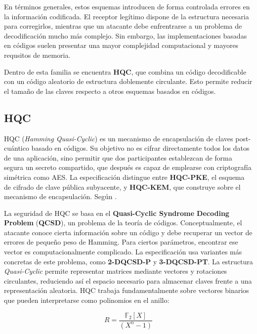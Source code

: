             En términos generales, estos esquemas introducen de forma controlada errores en la información codificada. El receptor legítimo dispone de la estructura necesaria para corregirlos, 
            mientras que un atacante debe enfrentrarse a un problema de decodificación mucho más complejo. Sin embargo, las implementaciones basadas en códigos suelen presentar una mayor complejidad
            computacional y mayores requsitos de memoria. 

            Dentro de esta familia se encuentra \textbf{HQC}, que combina un código decodificable con un código aleatorio de estructura doblemente circulante. Esto permite reducir el tamaño 
            de las claves respecto a otros esquemas basados en códigos. 


    \subsection{HQC}
    
    HQC (\textit{Hamming Quasi-Cyclic}) es un mecanismo de encapsulación de claves post-cuántico basado en códigos. Su objetivo no es cifrar directamente todos los datos de una aplicación, sino 
    permitir que dos participantes establezcan de forma segura un secreto compartido, que después es capaz de emplearse con criptografía simétrica como AES. La especificación distingue entre \textbf{HQC-PKE}, el esquema
    de cifrado de clave pública subyacente, y \textbf{HQC-KEM}, que construye sobre el mecanismo de encapsulación. Según \cite{noauthor_hamming_nodate}.

    La seguridad de HQC se basa en el \textbf{Quasi-Cyclic Syndrome Decoding Problem} (\textbf{QCSD}), un problema de la teoría de códigos. Conceptualmente, el atacante conoce cierta información 
    sobre un código y debe recuperar un vector de errores de pequeño peso de Hamming. Para ciertos parámetros, encontrar ese vector es computacionalmente complicado. La especificación usa variantes 
    más concretas de este problema, como \textbf{2-DQCSD-P} y \textbf{3-DQCSD-PT}. La estructura \textit{Quasi-Cyclic} permite representar matrices mediante vectores y rotaciones circulantes, reduciendo así
    el espacio necesario para almacenar claves frente a una representación aleatoria. HQC trabaja fundamentalmente sobre vectores binarios que pueden interpretarse como polinomios en el anillo:
    
    \begin{equation}
        R = \frac{\mathbb{F}_2[X]}{(X^n - 1)}
    \end{equation}
    
